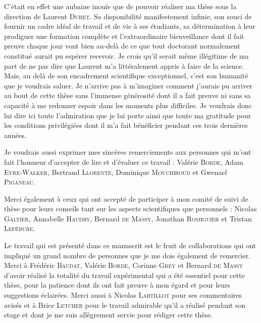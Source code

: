 C'était en effet une aubaine inouïe que de pouvoir réaliser ma thèse sous la direction de Laurent \textsc{Duret}.
Sa disponibilité manifestement infinie, son souci de fournir un cadre idéal de travail et de vie à ses étudiants, sa détermination à leur prodiguer une formation complète et l'extraordinaire bienveillance dont il fait preuve chaque jour vont bien au-delà de ce que tout doctorant normalement constitué aurait pu espérer recevoir.
Je crois qu'il serait même illégitime de ma part de ne pas dire que Laurent m'a littéralement appris à faire de la science.
Mais, au delà de son encadrement scientifique exceptionnel, c'est son humanité que je voudrais saluer.
Je n'arrive pas à m'imaginer comment j'aurais pu arriver au bout de cette thèse sans l'immense générosité dont il a fait preuve ni sans sa capacité à me redonner espoir dans les moments plus difficiles.
Je voudrais donc lui dire ici toute l'admiration que je lui porte ainsi que toute ma gratitude pour les conditions privilégiées dont il m'a fait bénéficier pendant ces trois dernières années.

Je voudrais aussi exprimer mes sincères remerciements aux personnes qui m'ont fait l'honneur d'accepter de lire et d'évaluer ce travail : Valérie \textsc{Borde}, Adam \textsc{Eyre-Walker}, Bertrand \textsc{Llorente}, Dominique \textsc{Mouchiroud} et Gwenael \textsc{Piganeau}.

Merci également à ceux qui ont accepté de participer à mon comité de suivi de thèse pour leurs conseils tant sur les aspects scientifiques que personnels : 
Nicolas \textsc{Galtier},
Annabelle \textsc{Haudry},
Bernard \textsc{de Massy},
Jonathan \textsc{Romiguier} et
Tristan \textsc{Lefébure}.


Le travail qui est présenté dans ce manuscrit est le fruit de collaborations qui ont impliqué un grand nombre de personnes que je me dois également de remercier.
Merci à Frédéric \textsc{Baudat}, Valérie \textsc{Borde}, Corinne \textsc{Grey} et Bernard \textsc{de Massy} d'avoir réalisé la totalité du travail expérimental qui a été essentiel pour cette thèse, pour la patience dont ils ont fait preuve à mon égard et pour leurs suggestions éclairées.
Merci aussi à Nicolas \textsc{Lartillot} pour ses commentaires avisés et à Brice \textsc{Letcher} pour le travail admirable qu'il a réalisé pendant son stage et dont je me suis allègrement servie pour rédiger cette thèse.\\



